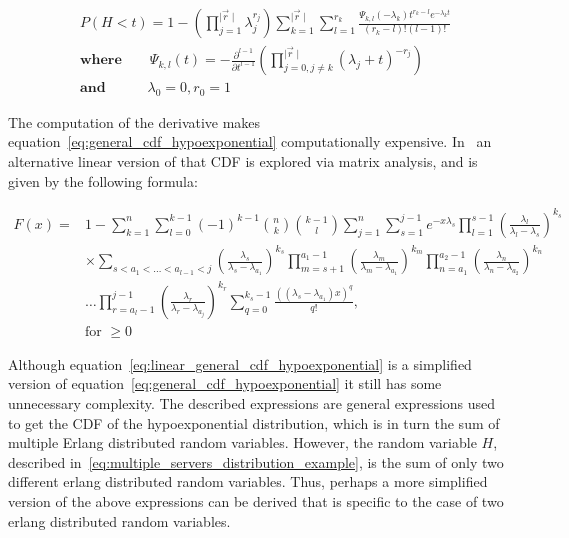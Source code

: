 \begin{align} \label{eq:general_cdf_hypoexponential}
    & P(H < t) = 1 - \left( \prod_{j=1}^{\mid \vec{r} \mid} \lambda_j^{r_j}
    \right) \sum_{k=1}^{\mid \vec{r} \mid} \sum_{l=1}^{r_k}
    \frac{\Psi_{k,l}(-\lambda_k)t^{r_k - l} e^{-\lambda_k t}}
    {(r_k - l)! (l - 1)!} \nonumber \\
    & \textbf{where} \qquad \Psi_{k,l}(t) = - \frac{\partial^{l - 1}}
    {\partial t ^{l - 1}} \left( \prod_{j = 0, j \neq k}^{\mid \vec{r} \mid}
    (\lambda_j + t)^{-r_j} \right) \nonumber \\
    & \textbf{and} \quad \qquad \lambda_0 = 0, r_0 = 1
\end{align}


The computation of the derivative makes
equation~\eqref{eq:general_cdf_hypoexponential} computationally expensive.
In~\cite{Legros2015} an alternative linear version of that CDF is explored via
matrix analysis, and is given by the following formula:

\small
\begin{equation} \label{eq:linear_general_cdf_hypoexponential}
    \begin{split}
        F(x) = &1 - \sum_{k=1}^{n} \sum_{l=0}^{k-1} (-1)^{k-1} \binom{n}{k}
            \binom{k-1}{l} \sum_{j=1}^{n} \sum_{s=1}^{j-1} e^{-x \lambda_s}
            \prod_{l=1}^{s-1} \left( \frac{\lambda_l}{\lambda_l - \lambda_s} \right)
            ^ {k_s} \\
        & \times \sum_{s < a_1 < \dots < a_{l-1} < j}
            \left( \frac{\lambda_s}{\lambda_s - \lambda_{a_1}} \right) ^ {k_s}
            \prod_{m=s+1}^{a_1-1} \left( \frac{\lambda_m}{\lambda_m -
            \lambda_{a_1}}\right) ^ {k_m}
            \prod_{n=a_1}^{a_2-1} \left( \frac{\lambda_n}{\lambda_n -
            \lambda_{a_2}}\right) ^ {k_n} \\
        & \dots \prod_{r=a_l-1}^{j-1} \left( \frac{\lambda_r}{\lambda_r -
            \lambda_{a_j}}\right) ^ {k_r}
            \sum_{q=0}^{k_s - 1} \frac{((\lambda_s - \lambda_{a_1})x)^q}{q!}, \\
        & \text{for } \geq 0
    \end{split}
\end{equation}
\normalsize

Although equation~\eqref{eq:linear_general_cdf_hypoexponential} is a simplified
version of equation~\eqref{eq:general_cdf_hypoexponential} it still has some
unnecessary complexity.
The described expressions are general expressions used to get the CDF of
the hypoexponential distribution, which is in turn the sum of multiple
Erlang distributed random variables.
However, the random variable \(H\), described
in~\eqref{eq:multiple_servers_distribution_example}, is the sum of only two
different erlang distributed random variables.
Thus, perhaps a more simplified version of the above expressions can be derived
that is specific to the case of two erlang distributed random variables.


